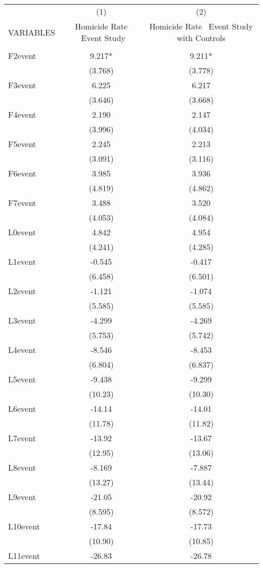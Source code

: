 \documentclass[]{article}
\begin{document}
\begin{tabular}{lcc} \hline
 & (1) & (2) \\
VARIABLES & Homicide Rate \ Event Study & Homicide Rate \ Event Study with Controls \\ \hline
 &  &  \\
F2event & 9.217* & 9.211* \\
 & (3.768) & (3.778) \\
F3event & 6.225 & 6.217 \\
 & (3.646) & (3.668) \\
F4event & 2.190 & 2.147 \\
 & (3.996) & (4.034) \\
F5event & 2.245 & 2.213 \\
 & (3.091) & (3.116) \\
F6event & 3.985 & 3.936 \\
 & (4.819) & (4.862) \\
F7event & 3.488 & 3.520 \\
 & (4.053) & (4.084) \\
L0event & 4.842 & 4.954 \\
 & (4.241) & (4.285) \\
L1event & -0.545 & -0.417 \\
 & (6.458) & (6.501) \\
L2event & -1.121 & -1.074 \\
 & (5.585) & (5.585) \\
L3event & -4.299 & -4.269 \\
 & (5.753) & (5.742) \\
L4event & -8.546 & -8.453 \\
 & (6.804) & (6.837) \\
L5event & -9.438 & -9.299 \\
 & (10.23) & (10.30) \\
L6event & -14.14 & -14.01 \\
 & (11.78) & (11.82) \\
L7event & -13.92 & -13.67 \\
 & (12.95) & (13.06) \\
L8event & -8.169 & -7.887 \\
 & (13.27) & (13.44) \\
L9event & -21.05 & -20.92 \\
 & (8.595) & (8.572) \\
L10event & -17.84 & -17.73 \\
 & (10.90) & (10.85) \\
L11event & -26.83 & -26.78 \\

\end{tabular}
\end{document}

